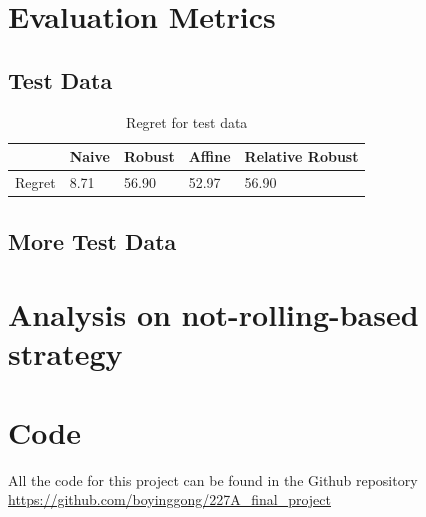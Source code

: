 \documentclass{article}
\begin{document}

\section{\textbf{Evaluation Metrics}}

\subsection{Test Data}

    \begin{table}[H]
        \begin{tabular}{|l|p{1.3cm}|p{1.3cm}|p{1.3cm}|p{1.3cm}|}
        \hline
        & Naive & Robust & Affine & Relative Robust \\ 
        \hline
        Regret & 8.71 & 56.90 & 52.97 & 56.90 \\
        \hline
        \end{tabular}
        \caption{Regret for test data}
    \end{table}

\subsection{More Test Data}






\clearpage
\newpage
\appendix

\onecolumn







\section{Analysis on not-rolling-based strategy}\label{apx:notRollingStrategy}





\section{Code}\label{apx:code}

All the code for this project can be found in the Github repository \url{https://github.com/boyinggong/227A_final_project}
\end{document}
